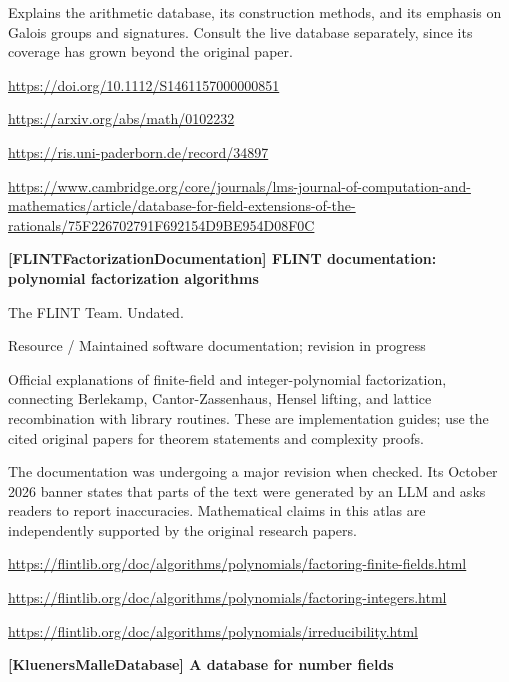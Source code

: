 \documentclass[11pt,a4paper,oneside,openany]{book}
\begin{document}
\color{black} Explains the arithmetic database, its construction methods, and its emphasis on Galois groups and signatures. Consult the live database separately, since its coverage has grown beyond the original paper.\par
{\footnotesize\url{https://doi.org/10.1112/S1461157000000851}}\par
{\footnotesize\url{https://arxiv.org/abs/math/0102232}}\par
{\footnotesize\url{https://ris.uni-paderborn.de/record/34897}}\par
{\footnotesize\url{https://www.cambridge.org/core/journals/lms-journal-of-computation-and-mathematics/article/database-for-field-extensions-of-the-rationals/75F226702791F692154D9BE954D08F0C}}\par
\vspace{9pt}
\hypertarget{ref:FLINTFactorizationDocumentation}{}
{\sffamily\bfseries\color{atlasgreen}[FLINTFactorizationDocumentation] FLINT documentation: polynomial factorization algorithms}\par
\color{black} The FLINT Team. Undated.\par
{\small\sffamily\color{atlasgold}Resource / Maintained software documentation; revision in progress}\par
\color{black} Official explanations of finite-field and integer-polynomial factorization, connecting Berlekamp, Cantor-Zassenhaus, Hensel lifting, and lattice recombination with library routines. These are implementation guides; use the cited original papers for theorem statements and complexity proofs.\par
{\small The documentation was undergoing a major revision when checked. Its October 2026 banner states that parts of the text were generated by an LLM and asks readers to report inaccuracies. Mathematical claims in this atlas are independently supported by the original research papers.}\par
{\footnotesize\url{https://flintlib.org/doc/algorithms/polynomials/factoring-finite-fields.html}}\par
{\footnotesize\url{https://flintlib.org/doc/algorithms/polynomials/factoring-integers.html}}\par
{\footnotesize\url{https://flintlib.org/doc/algorithms/polynomials/irreducibility.html}}\par
\vspace{9pt}
\hypertarget{ref:KluenersMalleDatabase}{}
{\sffamily\bfseries\color{atlasgreen}[KluenersMalleDatabase] A database for number fields}\par
\end{document}
